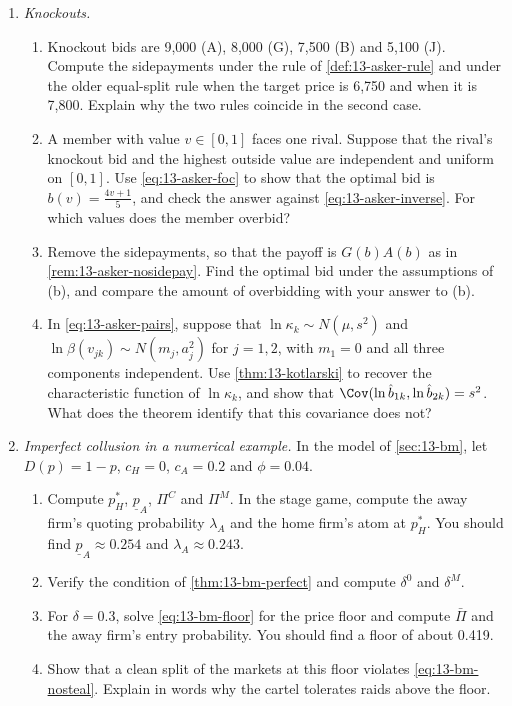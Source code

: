 \begin{enumerate}[label=\arabic*., leftmargin=*, itemsep=6pt]
\item \textit{Knockouts.}
\begin{enumerate}[label=(\alph*)]
  \item Knockout bids are 9,000 (A), 8,000 (G), 7,500 (B) and 5,100 (J). Compute the sidepayments under the rule of
  \cref{def:13-asker-rule} and under the older equal-split rule when the target price is 6,750 and when it is
  7,800. Explain why the two rules coincide in the second case.
  \item A member with value $v \in [0,1]$ faces one rival. Suppose that the rival's knockout bid and the highest
  outside value are independent and uniform on $[0,1]$. Use \eqref{eq:13-asker-foc} to show that the optimal bid
  is $b(v) = \frac{4v + 1}{5}$, and check the answer against \eqref{eq:13-asker-inverse}. For which values does
  the member overbid?
  \item Remove the sidepayments, so that the payoff is $G(b)A(b)$ as in \cref{rem:13-asker-nosidepay}. Find the
  optimal bid under the assumptions of (b), and compare the amount of overbidding with your answer to (b).
  \item In \eqref{eq:13-asker-pairs}, suppose that $\ln\kappa_k \sim N(\mu, s^2)$ and
  $\ln\beta(v_{jk}) \sim N(m_j, a_j^2)$ for $j = 1, 2$, with $m_1 = 0$ and all three components independent. Use
  \cref{thm:13-kotlarski} to recover the characteristic function of $\ln\kappa_k$, and show that
  $\Cov(\ln\hat b_{1k}, \ln\hat b_{2k}) = s^2$. What does the theorem identify that this covariance does not?
\end{enumerate}

\item \textit{Imperfect collusion in a numerical example.} In the model of \cref{sec:13-bm}, let $D(p) = 1 - p$,
$c_H = 0$, $c_A = 0.2$ and $\phi = 0.04$.
\begin{enumerate}[label=(\alph*)]
  \item Compute $p_H^*$, $\underline p_A$, $\Pi^C$ and $\Pi^M$. In the stage game, compute the away firm's quoting
  probability $\lambda_A$ and the home firm's atom at $p_H^*$. You should find $\underline p_A \approx 0.254$ and
  $\lambda_A \approx 0.243$.
  \item Verify the condition of \cref{thm:13-bm-perfect} and compute $\delta^0$ and $\delta^M$.
  \item For $\delta = 0.3$, solve \eqref{eq:13-bm-floor} for the price floor and compute $\bar\Pi$ and the away
  firm's entry probability. You should find a floor of about 0.419.
  \item Show that a clean split of the markets at this floor violates \eqref{eq:13-bm-nosteal}. Explain in words
  why the cartel tolerates raids above the floor.
\end{enumerate}


\end{enumerate}
